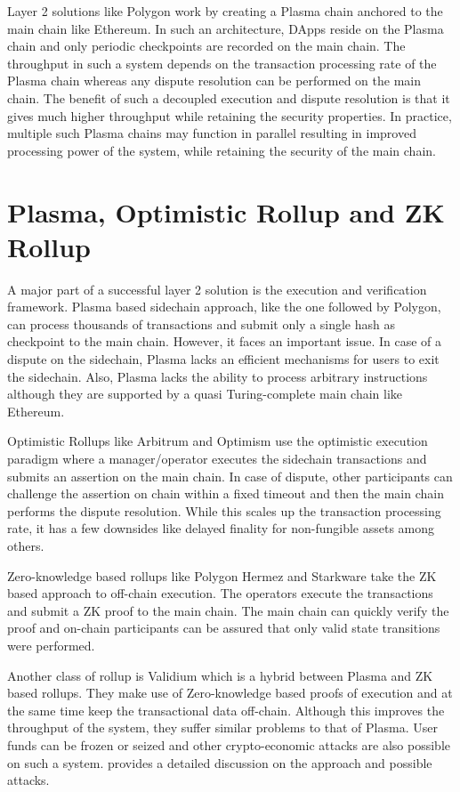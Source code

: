 \documentclass[sigconf, screen=true, nonacm]{acmart}
\begin{document}
    Layer 2 solutions like Polygon work by creating a Plasma chain anchored to the main chain like Ethereum. In such an architecture, DApps reside on the Plasma chain and only periodic checkpoints are recorded on the main chain. The throughput in such a system depends on the transaction processing rate of the Plasma chain whereas any dispute resolution can be performed on the main chain. The benefit of such a decoupled execution and dispute resolution is that it gives much higher throughput while retaining the security properties. In practice, multiple such Plasma chains may function in parallel resulting in improved processing power of the system, while retaining the security of the main chain. 

\section{Plasma, Optimistic Rollup and ZK Rollup}\label{rollup}
    A major part of a successful layer 2 solution is the execution and verification framework. Plasma based sidechain approach, like the one followed by Polygon, can process thousands of transactions and submit only a single hash as checkpoint to the main chain. However, it faces an important issue. In case of a dispute on the sidechain, Plasma lacks an efficient mechanisms for users to exit the sidechain. Also, Plasma lacks the ability to process arbitrary instructions although they are supported by a quasi Turing-complete main chain like Ethereum. 

    Optimistic Rollups like Arbitrum and Optimism use the optimistic execution paradigm where a manager/operator executes the sidechain transactions and submits an assertion on the main chain. In case of dispute, other participants can challenge the assertion on chain within a fixed timeout and then the main chain performs the dispute resolution. While this scales up the transaction processing rate, it has a few downsides like delayed finality for non-fungible assets among others. 

    Zero-knowledge based rollups like Polygon Hermez and Starkware take the ZK based approach to off-chain execution. The operators execute the transactions and submit a ZK proof to the main chain. The main chain can quickly verify the proof and on-chain participants can be assured that only valid state transitions were performed. 

    Another class of rollup is Validium which is a hybrid between Plasma and ZK based rollups. They make use of Zero-knowledge based proofs of execution and at the same time keep the transactional data off-chain. Although this improves the throughput of the system, they suffer similar problems to that of Plasma. User funds can be frozen or seized and other crypto-economic attacks are also possible on such a system. \cite{StarkEx:2020} provides a detailed discussion on the approach and possible attacks. 
\end{document}

